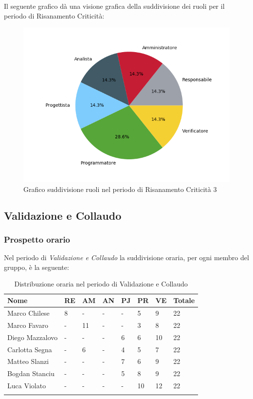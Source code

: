 Il seguente grafico dà una visione grafica della suddivisione dei ruoli per il periodo di Risanamento Criticità:\begin{figure}[H]
	\centering
	\includegraphics[width=0.8\linewidth]{./images/torta_rc3.png}
	\caption{Grafico suddivisione ruoli nel periodo di Risanamento Criticità 3}
	\label{fig:grafico suddivione ruoli rc3}
\end{figure}

\newpage

\subsection{Validazione e Collaudo}
\subsubsection{Prospetto orario}
Nel periodo di \textit{Validazione e Collaudo} la suddivisione oraria, per ogni membro del gruppo, è la seguente:

\begin{longtable}{|C{.30\textwidth}|C{.06\textwidth}|C{.06\textwidth}|C{.06\textwidth} | C{.06\textwidth}| C{.06\textwidth} | C{.06\textwidth} | C{.10\textwidth} |}
	\hline
	\textbf{Nome} & \textbf{RE} & \textbf{AM} & \textbf{AN} & \textbf{PJ} & \textbf{PR} & \textbf{VE} & \textbf{Totale}\\
	\hline 
	Marco Chilese & 8 & - & - & - & 5 & 9 & 22 \\
	\hline
	Marco Favaro &  - & 11 & - & - & 3 & 8 & 22 \\
	\hline
	Diego Mazzalovo & - & - & - & 6 & 6 & 10 & 22 \\
	\hline
	Carlotta Segna & - & 6 & - & 4 & 5 & 7 & 22 \\
	\hline
	Matteo Slanzi & - & - & - & 7 & 6 & 9 & 22 \\
	\hline
	Bogdan Stanciu & - & - & - & 5 & 8 & 9 & 22 \\
	\hline
	Luca Violato & - & - & - & - & 10 & 12 & 22 \\   
	\hline
	
	
	\caption{Distribuzione oraria nel periodo di Validazione e Collaudo}
	\label{Distribuzione oraria vc}
\end{longtable}

